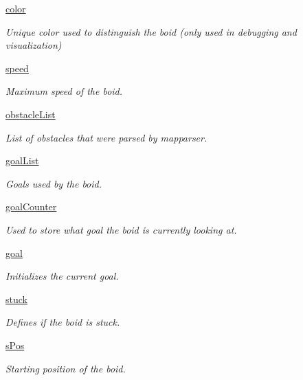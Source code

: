 \begin{DoxyCompactItemize}
\hyperlink{classboid_1_1Boid_a6a2ca3d501e4b2b0d531d4d968487907}{color}
\begin{DoxyCompactList}\small\item\em Unique color used to distinguish the boid (only used in debugging and visualization) \end{DoxyCompactList}\item 
\hyperlink{classboid_1_1Boid_a4cf2a59e0efad2d71d8fee93fdd6538b}{speed}
\begin{DoxyCompactList}\small\item\em Maximum speed of the boid. \end{DoxyCompactList}\item 
\hyperlink{classboid_1_1Boid_a9db9b88d02af40d3773b034560959694}{obstacle\-List}
\begin{DoxyCompactList}\small\item\em List of obstacles that were parsed by mapparser. \end{DoxyCompactList}\item 
\hyperlink{classboid_1_1Boid_a7a3492977220ee1f7623aa9643a2fea4}{goal\-List}
\begin{DoxyCompactList}\small\item\em Goals used by the boid. \end{DoxyCompactList}\item 
\hyperlink{classboid_1_1Boid_a8a871af6fc4d19477ce4881eb9ddc629}{goal\-Counter}
\begin{DoxyCompactList}\small\item\em Used to store what goal the boid is currently looking at. \end{DoxyCompactList}\item 
\hyperlink{classboid_1_1Boid_afe8350d9d4c1eeb15a5df7337328e1c7}{goal}
\begin{DoxyCompactList}\small\item\em Initializes the current goal. \end{DoxyCompactList}\item 
\hyperlink{classboid_1_1Boid_a099882fd7d72bfd06c15ec20b0425905}{stuck}
\begin{DoxyCompactList}\small\item\em Defines if the boid is stuck. \end{DoxyCompactList}\item 
\hyperlink{classboid_1_1Boid_a92bf79dcfff9e21d33611cfc89f8823c}{s\-Pos}
\begin{DoxyCompactList}\small\item\em Starting position of the boid. \end{DoxyCompactList}\item 

\end{DoxyCompactItemize}

